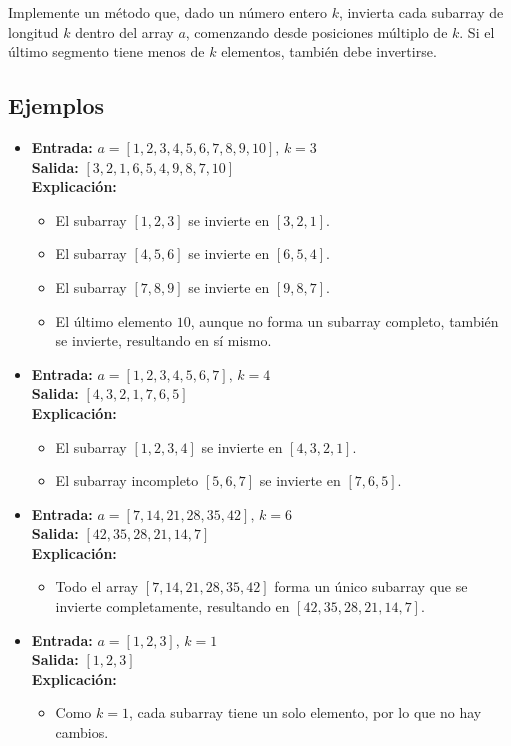 Implemente un método que, dado un número entero \(k\), invierta cada subarray de longitud \(k\) dentro del array \(a\), comenzando desde posiciones múltiplo de \(k\). Si el último segmento tiene menos de \(k\) elementos, también debe invertirse.

\subsection*{Ejemplos}

\begin{itemize}
    \item \textbf{Entrada:} \(a = [1, 2, 3, 4, 5, 6, 7, 8, 9, 10], \, k = 3\)\\
    \textbf{Salida:} \([3, 2, 1, 6, 5, 4, 9, 8, 7, 10]\)\\
    \textbf{Explicación:} 
    \begin{itemize}
        \item El subarray \([1, 2, 3]\) se invierte en \([3, 2, 1]\).
        \item El subarray \([4, 5, 6]\) se invierte en \([6, 5, 4]\).
        \item El subarray \([7, 8, 9]\) se invierte en \([9, 8, 7]\).
        \item El último elemento \(10\), aunque no forma un subarray completo, también se invierte, resultando en sí mismo.
    \end{itemize}

    \item \textbf{Entrada:} \(a = [1, 2, 3, 4, 5, 6, 7], \, k = 4\)\\
    \textbf{Salida:} \([4, 3, 2, 1, 7, 6, 5]\)\\
    \textbf{Explicación:}
    \begin{itemize}
        \item El subarray \([1, 2, 3, 4]\) se invierte en \([4, 3, 2, 1]\).
        \item El subarray incompleto \([5, 6, 7]\) se invierte en \([7, 6, 5]\).
    \end{itemize}

    \item \textbf{Entrada:} \(a = [7, 14, 21, 28, 35, 42], \, k = 6\)\\
    \textbf{Salida:} \([42, 35, 28, 21, 14, 7]\)\\
    \textbf{Explicación:}
    \begin{itemize}
        \item Todo el array \([7, 14, 21, 28, 35, 42]\) forma un único subarray que se invierte completamente, resultando en \([42, 35, 28, 21, 14, 7]\).
    \end{itemize}

    \item \textbf{Entrada:} \(a = [1, 2, 3], \, k = 1\)\\
    \textbf{Salida:} \([1, 2, 3]\)\\
    \textbf{Explicación:}
    \begin{itemize}
        \item Como \(k = 1\), cada subarray tiene un solo elemento, por lo que no hay cambios.
    \end{itemize}
\end{itemize}
